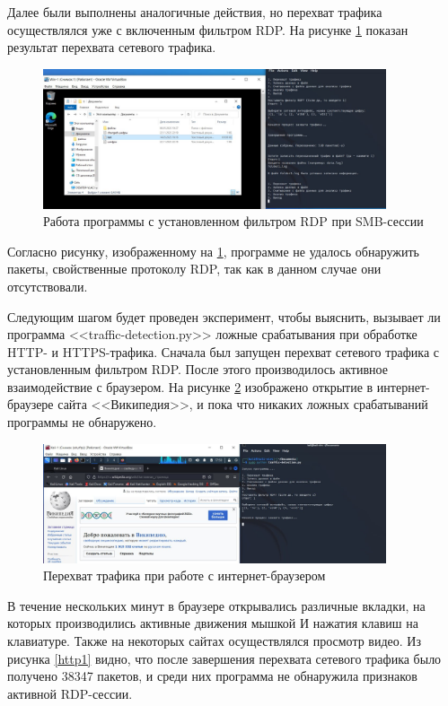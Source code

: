 \documentclass[bachelor, och, coursework]{SCWorks}
\begin{document}
Далее были выполнены аналогичные действия, но перехват трафика осуществлялся уже с включенным фильтром RDP.
На рисунке \ref{smbfilter} показан результат перехвата сетевого трафика.

\begin{figure}[H]
  \centering
  \includegraphics[width=0.9\textwidth]{photo/smb-filter.jpg}
  \caption{Работа программы с установленном фильтром RDP при SMB-сессии}
  \label{smbfilter}
\end{figure}

Согласно рисунку, изображенному на \ref{smbfilter}, программе не удалось обнаружить пакеты, свойственные протоколу RDP, 
так как в данном случае они отсутствовали.   

Следующим шагом будет проведен эксперимент, чтобы выяснить, вызывает ли программа <<traffic-detection.py>> ложные срабатывания 
при обработке HTTP- и HTTPS-трафика. Сначала был запущен перехват сетевого трафика с установленным фильтром RDP. После этого
производилось активное взаимодействие с браузером. На рисунке \ref{http} изображено открытие в интернет-браузере сайта <<Википедия>>, и
пока что никаких ложных срабатываний программы не обнаружено.

\begin{figure}[H]
  \centering
  \includegraphics[width=0.9\textwidth]{photo/http.jpg}
  \caption{Перехват трафика при работе с интернет-браузером}
  \label{http}
\end{figure}

В течение нескольких минут в браузере открывались различные вкладки, на которых производились активные движения мышкой И
нажатия клавиш на клавиатуре. Также на некоторых сайтах осуществлялся просмотр видео. 
Из рисунка \ref{http1} видно, что после завершения перехвата сетевого трафика было получено 38347 пакетов, и среди них программа 
не обнаружила признаков активной RDP-сессии. 
\end{document}

